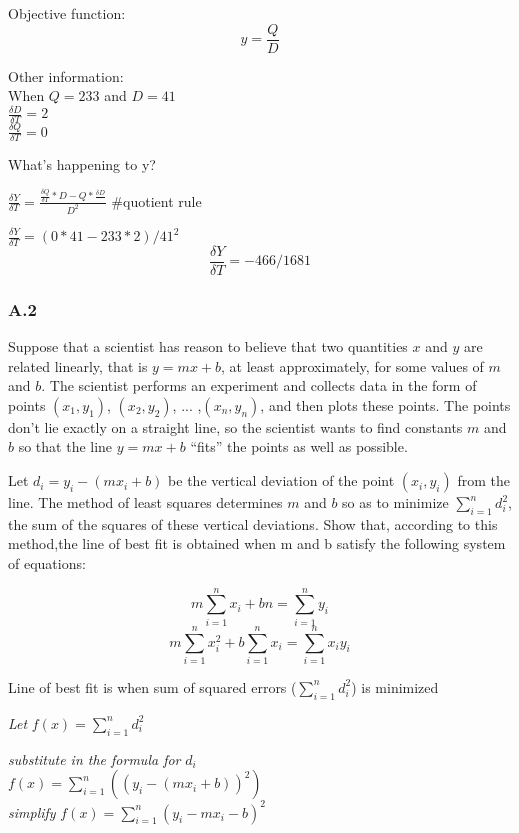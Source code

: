 \documentclass[11pt]{article}
\begin{document}
    Objective function:\\
\[y = \frac{Q}{D}\]

Other information:\\
When \(Q = 233\) and \(D = 41\)\\
\(\frac{\delta D}{\delta T} = 2\)\\
\(\frac{\delta Q}{\delta T} = 0\)

What's happening to y?

\(\frac{\delta Y}{\delta T} = \frac{\frac{\delta Q}{\delta T}*D - Q*\frac{\delta D}{}}{D^2}\)
\#quotient rule

\(\frac{\delta Y}{\delta T} = (0*41 - 233*2)/41^2\)
\[\frac{\delta Y}{\delta T} = -466/1681\]

    \subsubsection{A.2}\label{a.2}

Suppose that a scientist has reason to believe that two quantities \(x\)
and \(y\) are related linearly, that is \(y = mx + b\), at least
approximately, for some values of \(m\) and \(b\). The scientist
performs an experiment and collects data in the form of points
\((x_1, y_1)\), \((x_2, y_2)\), ... ,\((x_n, y_n)\), and then plots
these points. The points don't lie exactly on a straight line, so the
scientist wants to find constants \(m\) and \(b\) so that the line
\(y = mx + b\) ``fits'' the points as well as possible.

Let \(d_i = y_i − (mx_i + b)\) be the vertical deviation of the point
\((x_i, y_i)\) from the line. The method of least squares determines
\(m\) and \(b\) so as to minimize \(\sum_{i=1}^{n} d^2_i\), the sum of
the squares of these vertical deviations. Show that, according to this
method,the line of best fit is obtained when m and b satisfy the
following system of equations:

\[m\sum_{i=1}^{n} x_i + bn = \sum_{i=1}^{n}y_i\]
\[m\sum_{i=1}^{n} x^2_i + b\sum_{i=1}^{n}x_i = \sum_{i=1}^{n}x_iy_i\]

    Line of best fit is when sum of squared errors
(\(\sum_{i=1}^{n} d^2_i\)) is minimized

\emph{Let} \(f(x) = \sum_{i=1}^{n} d^2_i\)

\emph{substitute in the formula for} \(d_i\)\\
\(f(x) = \sum_{i=1}^{n} ( (y_i − (mx_i + b))^2)\)\\
\emph{simplify} \(f(x) = \sum_{i=1}^{n} (y_i − mx_i - b)^2\)
\end{document}
